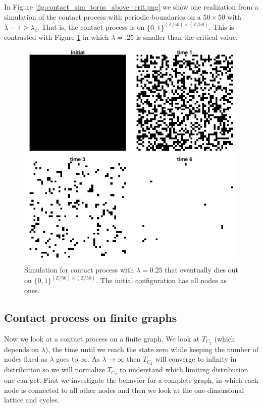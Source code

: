 \documentclass{article}
\theoremstyle{plain}
\theoremstyle{definition}
\theoremstyle{remark}
\numberwithin{equation}{section}
\newcommand{\Z}{\mathbb{Z}}
\begin{document}
In Figure \ref{fig:contact_sim_torus_above_crit.png} we show one realization from a simulation of the contact process with periodic boundaries on a $50 \times 50$ with $\lambda = 4 \geq \lambda_c$.
That is, the contact process is on $\{0,1\}^{(\Z/50) \times (\Z/50)}$.
This is contrasted with Figure \ref{fig:contact_sim_torus_below_crit.png} in which $\lambda = .25$ is smaller than the critical value.

\begin{figure}[H]
  \centering
    \includegraphics[width=.80\textwidth]{figures/contact_simulation_torus_25_below_crit.png}
   \caption{Simulation for contact process with $\lambda = 0.25$ that eventually dies out on $\{0,1\}^{(\Z/50) \times (\Z/50)}$. The initial configuration has all nodes as ones.}
  \label{fig:contact_sim_torus_below_crit.png}
\end{figure}

\subsection{Contact process on finite graphs}

Now we look at a contact process on a finite graph.
We look at $T_{C_2}$ (which depends on $\lambda$), the time until we reach the state zero while keeping the number of nodes fixed as $\lambda$ goes to $\infty$.
As $\lambda \to \infty$ then $T_{C_2}$ will converge to infinity in distribution so we will normalize $T_{C_2}$ to understand which limiting distribution one can get.
First we investigate the behavior for a complete graph, in which each node is connected to all other nodes and then we look at the one-dimensional lattice and cycles.
\end{document}
